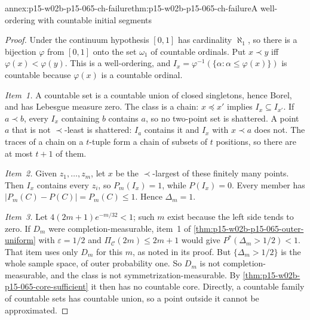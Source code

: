 \begin{annexitem}{annex:p15-w02b-p15-065-ch-failure}{thm:p15-w02b-p15-065-ch-failure}{A well-ordering with countable initial segments}
\begin{proof}
Under the continuum hypothesis \([0,1]\) has cardinality \(\aleph_1\), so
there is a bijection \(\varphi\) from \([0,1]\) onto the set \(\omega_1\) of
countable ordinals. Put \(x\prec y\) iff \(\varphi(x)<\varphi(y)\). This is
a well-ordering, and \(I_x=\varphi^{-1}(\{\alpha:\alpha\leq\varphi(x)\})\) is
countable because \(\varphi(x)\) is a countable ordinal.

\emph{Item~1.} A countable set is a countable union of closed singletons,
hence Borel, and has Lebesgue measure zero. The class is a chain:
\(x\preceq x'\) implies \(I_x\subseteq I_{x'}\). If \(a\prec b\), every
\(I_x\) containing \(b\) contains \(a\), so no two-point set is shattered. A
point \(a\) that is not \(\prec\)-least is shattered: \(I_a\) contains it
and \(I_x\) with \(x\prec a\) does not. The traces of a chain on a
\(t\)-tuple form a chain of subsets of \(t\) positions, so there are at
most \(t+1\) of them.

\emph{Item~2.} Given \(z_1,\ldots,z_m\), let \(x\) be the \(\prec\)-largest
of these finitely many points. Then \(I_x\) contains every \(z_i\), so
\(P_m(I_x)=1\), while \(P(I_x)=0\). Every member has
\(|P_m(C)-P(C)|=P_m(C)\leq1\). Hence \(\Delta_m=1\).

\emph{Item~3.} Let \(4(2m+1)e^{-m/32}<1\); such \(m\) exist because the
left side tends to zero. If \(D_m\) were completion-measurable, item~1 of
\cref{thm:p15-w02b-p15-065-outer-uniform} with \(\varepsilon=1/2\) and
\(\Pi_{\mathcal C}(2m)\leq2m+1\) would give
\(P^{*}(\Delta_m>1/2)<1\). That item uses only \(D_m\) for this \(m\), as
noted in its proof. But \(\{\Delta_m>1/2\}\) is the whole sample space,
of outer probability one. So \(D_m\) is not completion-measurable, and the
class is not symmetrization-\allowbreak measurable. By
\cref{thm:p15-w02b-p15-065-core-sufficient} it then has no countable core.
Directly, a countable family of countable sets has countable union, so a
point outside it cannot be approximated.


\end{proof}
\end{annexitem}
